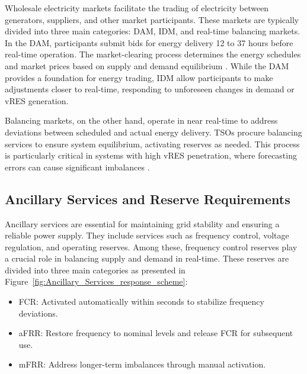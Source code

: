Wholesale electricity markets facilitate the trading of electricity between generators, suppliers, and other market participants. These markets are typically divided into three main categories: \gls{DAM}, \gls{IDM}, and real-time balancing markets. In the \gls{DAM}, participants submit bids for energy delivery 12 to 37 hours before real-time operation. The market-clearing process determines the energy schedules and market prices based on supply and demand equilibrium \cite{Algarvio:19b}. While the \gls{DAM} provides a foundation for energy trading, \gls{IDM} allow participants to make adjustments closer to real-time, responding to unforeseen changes in demand or \gls{vRES} generation.\par

Balancing markets, on the other hand, operate in near real-time to address deviations between scheduled and actual energy delivery. \gls{TSO}s procure balancing services to ensure system equilibrium, activating reserves as needed. This process is particularly critical in systems with high \gls{vRES} penetration, where forecasting errors can cause significant imbalances \cite{Algarvio:19a,Algarvio:20}.\par

\subsection{Ancillary Services and Reserve Requirements}

Ancillary services are essential for maintaining grid stability and ensuring a reliable power supply. They include services such as frequency control, voltage regulation, and operating reserves. Among these, frequency control reserves play a crucial role in balancing supply and demand in real-time. These reserves are divided into three main categories \cite{Algarvio:19a} as presented in Figure~\ref{fig:Ancillary_Services_response_scheme}:

\begin{itemize}
    \item	\gls{FCR}: Activated automatically within seconds to stabilize frequency deviations.
    \item	\gls{aFRR}: Restore frequency to nominal levels and release FCR for subsequent use.
    \item	\gls{mFRR}: Address longer-term imbalances through manual activation.
\end{itemize}



